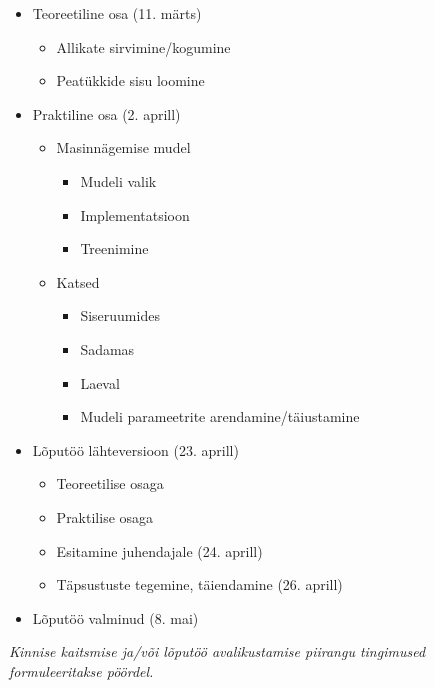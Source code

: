 \begin{itemize}
  \item Teoreetiline osa (11. märts)
    \begin{itemize}
      \item Allikate sirvimine/kogumine
      \item Peatükkide sisu loomine
    \end{itemize}
  \item Praktiline osa (2. aprill)
    \begin{itemize}
      \item Masinnägemise mudel
        \begin{itemize}
          \item Mudeli valik
          \item Implementatsioon
          \item Treenimine
        \end{itemize}
      \item Katsed
        \begin{itemize}
          \item Siseruumides
          \item Sadamas
          \item Laeval
          \item Mudeli parameetrite arendamine/täiustamine
        \end{itemize}
    \end{itemize}
  \item Lõputöö lähteversioon (23. aprill)
    \begin{itemize}
      \item Teoreetilise osaga
      \item Praktilise osaga
      \item Esitamine juhendajale (24. aprill)
      \item Täpsustuste tegemine, täiendamine (26. aprill)
    \end{itemize}
  \item Lõputöö valminud (8. mai)
\end{itemize}

\textit{Kinnise kaitsmise ja/või lõputöö avalikustamise piirangu tingimused formuleeritakse pöördel.}
